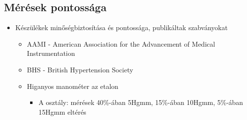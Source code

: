 \subsection{Mérések pontossága}
\begin{itemize}
    \item Készülékek minőségbiztosítása és pontossága, publikáltak szabványokat
    \begin{itemize}
        \item AAMI - American Association for the Advancement of Medical Instrumentation
        \item BHS - British Hypertension Society
        \item Higanyos manométer az etalon
        \begin{itemize}
            \item A osztály: mérések 40\%-ában 5Hgmm, 15\%-ában 10Hgmm, 5\%-ában 15Hgmm eltérés
        \end{itemize}
    \end{itemize}
\end{itemize}

\clearpage
